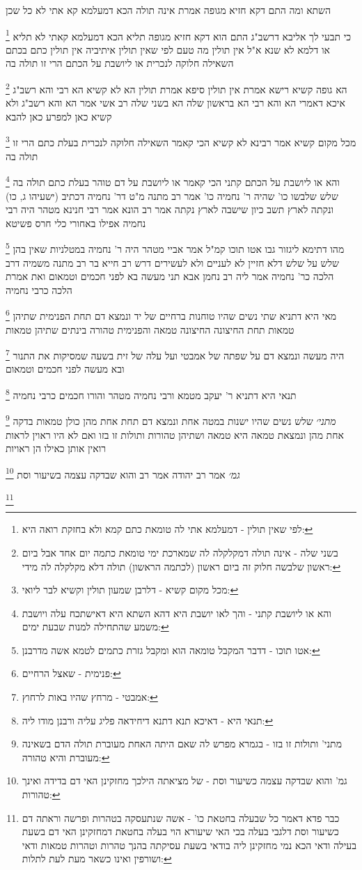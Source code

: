 \documentclass[12pt, openany]{book}
\newcommand{\footnotecomment}[1]{
	\renewcommand\thefootnote{}
	\footnote{#1}}
\newcommand{\commenta}[1]{\footnotecomment{#1}}
\begin{document}
{השתא ומה התם דקא חזיא מגופה אמרת אינה תולה הכא דמעלמא קא אתי לא כל שכן 
\commenta{לפי שאין תולין - דמעלמא אתי לה טומאת כתם קמא ולא בחזקת רואה היא:}
כי תבעי לך אליבא דרשב"ג התם הוא דקא חזיא מגופה תליא הכא דמעלמא קאתי לא תליא או דלמא לא שנא 
א"ל אין תולין מה טעם לפי שאין תולין 
איתיביה אין תולין כתם בכתם השאילה חלוקה לנכרית או ליושבת על הכתם הרי זו תולה בה 
\commenta{בשני שלה - אינה תולה דמקלקלה לה שמארכת ימי טומאת כתמה יום אחד אבל ביום ראשון שלבשה חלוק זה ביום ראשון (לכתמה הראשון) תולה דלא מקלקלה לה מידי:}
הא גופה קשיא רישא אמרת אין תולין סיפא אמרת תולין הא לא קשיא הא רבי והא רשב"ג 
איכא דאמרי הא והא רבי הא בראשון שלה הא בשני שלה 
רב אשי אמר הא והא רשב"ג ולא קשיא
כאן למפרע כאן להבא 
\commenta{מכל מקום קשיא - דלרבן שמעון תולין וקשיא לבר ליואי:}
מכל מקום קשיא אמר רבינא לא קשיא הכי קאמר השאילה חלוקה לנכרית בעלת כתם הרי זו תולה בה
\commenta{והא או ליושבת קתני - והך לאו יושבת היא דהא השתא היא דאישתכח עלה ויושבת משמע שהתחילה למנות שבעת ימים:}
והא או ליושבת על הכתם קתני הכי קאמר או ליושבת על דם טוהר בעלת כתם תולה בה
שלש שלבשו כו' שהיה ר' נחמיה כו' אמר רב מתנה מ"ט דר' נחמיה דכתיב (ישעיהו ג, כו) ונקתה לארץ תשב כיון שישבה לארץ נקתה 
אמר רב הונא אמר רבי חנינא מטהר היה רבי נחמיה אפילו באחורי כלי חרס פשיטא 
\commenta{אטו תוכו - דדבר המקבל טומאה הוא ומקבל גזרת כתמים לטמא אשה מדרבנן:}
מהו דתימא ליגזור גבו אטו תוכו קמ"ל 
אמר אביי מטהר היה ר' נחמיה במטלניות שאין בהן שלש על שלש דלא חזיין לא לעניים ולא לעשירים 
דרש רב חייא בר רב מתנה משמיה דרב הלכה כר' נחמיה אמר ליה רב נחמן אבא תני מעשה בא לפני חכמים וטמאום ואת אמרת הלכה כרבי נחמיה 
\commenta{פנימית - שאצל הרחיים:}
מאי היא דתניא שתי נשים שהיו טוחנות ברחיים של יד ונמצא דם תחת הפנימית שתיהן טמאות תחת החיצונה החיצונה טמאה והפנימית טהורה בינתים שתיהן טמאות 
\commenta{אמבטי - מרחץ שהיו באות לרחוץ:}
היה מעשה ונמצא דם על שפתה של אמבטי ועל עלה של זית בשעה שמסיקות את התנור ובא מעשה לפני חכמים וטמאום 
\commenta{תנאי היא - דאיכא תנא דתנא דיחידאה פליג עליה ורבנן מודו ליה:}
תנאי היא דתניא ר' יעקב מטמא ורבי נחמיה מטהר והורו חכמים כרבי נחמיה
\commenta{מתני' ותולות זו בזו - בגמרא מפרש לה שאם היתה האחת מעוברת תולה הדם בשאינה מעוברת והיא טהורה:}
{\large\emph{מתני׳}} שלש נשים שהיו ישנות במטה אחת ונמצא דם תחת אחת מהן כולן טמאות בדקה אחת מהן ונמצאת טמאה היא טמאה ושתיהן טהורות ותולות זו בזו ואם לא היו ראוין לראות רואין אותן כאילו הן ראויות
\commenta{גמ' והוא שבדקה עצמה כשיעור וסת - של מציאתה הילכך מחזקינן האי דם בדידה ואינך טהורות:}
{\large\emph{גמ׳}} אמר רב יהודה אמר רב והוא שבדקה עצמה בשיעור וסת 
\commenta{כבר פדא דאמר כל שבעלה בחטאת כו' - אשה שנתעסקה בטהרות ופרשה וראתה דם כשיעור וסת דלגבי בעלה בכי האי שיעורא הוי בעלה בחטאת דמחזקינן האי דם בשעת בעילה ודאי הכא נמי מחזקינן ליה בודאי בשעת עסיקתה בהנך טהרות וטהרות טמאות ודאי ושורפין ואינו כשאר מעת לעת לתלות:}
}
\end{document}

